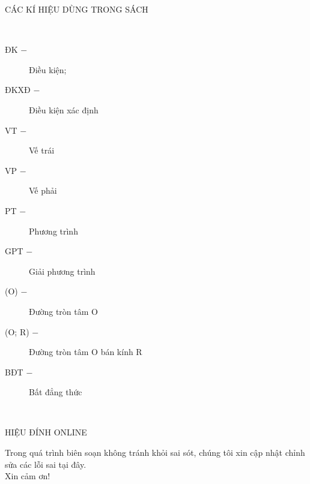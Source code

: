

\newpage

\begin{center}\color{blue}
	\MakeUppercase{\Large Các kí hiệu dùng trong sách}\\
	
\end{center}

\,
\hspace{4cm}
\begin{minipage}{7cm}
	\begin{description}
		\item[ĐK $-$] Điều kiện;
		\item[ĐKXĐ $-$] Điều kiện xác định
		\item[VT $-$] Vế trái
		\item[VP $-$] Vế phải
		\item[PT $-$]  Phương trình
		\item[GPT $-$] Giải phương trình
		\item[(O) $-$]  Đường tròn tâm O
		\item[(O; R) $-$]  Đường tròn tâm O bán kính R
		\item[BĐT $-$] Bất đẳng thức	
	\end{description}
\end{minipage}

\,
\vspace{4cm}


\begin{center}
	{
		\color{blue}
	\MakeUppercase{\Large HIỆU ĐÍNH ONLINE}
	}

	Trong quá trình biên soạn không tránh khỏi sai sót, chúng tôi xin cập nhật chỉnh sửa các lỗi sai tại đây.\\
	Xin cảm ơn!
\end{center}

\,
\hspace{3cm}

\begin{center}
\end{center}








